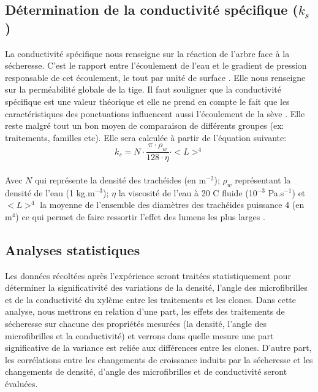 \documentclass{report}
\begin{document}
\subsection*{Détermination de la conductivité spécifique ($k_{s}$)}
La conductivité spécifique nous renseigne sur la réaction de l'arbre face à la sécheresse. C'est le rapport entre l’écoulement de l’eau et le gradient de pression responsable de cet écoulement, le tout par unité de surface \citep{Tyree1991}. Elle nous renseigne sur la perméabilité globale de la tige. Il faut souligner que la conductivité spécifique est une valeur théorique et elle ne prend en compte le fait que les caractéristiques des ponctuations influencent aussi l'écoulement de la sève \citep{Pothier1989}. %
Elle reste malgré tout un bon moyen de comparaison de différents groupes (ex: traitements, familles etc).  Elle sera calculée à partir de l'équation suivante: \\

\begin{equation}\label{eq:2}
k_{s} = N\cdot \frac{\pi \cdot \rho_{w}}{128 \cdot \eta} \cdot <L>^{4}
\end{equation}\\

Avec $N$ qui représente la densité des trachéides (en m$^{-2}$); $\rho_{w}$ représentant la densité de l'eau (1 kg.m$^{-3}$); $\eta$ la viscosité de l'eau à 20  \textdegree C fluide (10$^{-3}$ Pa.s$^{-1}$) et $<L>^{4}$ la moyenne de l'ensemble des diamètres des trachéides puissance 4 (en m$^{4}$) ce qui permet de faire ressortir l'effet des lumens les plus larges \citep{Tyree1991}.


\subsection*{Analyses statistiques}
Les données récoltées après l'expérience seront traitées statistiquement pour déterminer la significativité des variations de la densité, l'angle des microfibrilles et de la conductivité du xylème entre les traitements et les clones. Dans cette analyse, nous mettrons en relation d'une part, les effets des traitements de sécheresse sur chacune des propriétés mesurées (la densité, l'angle des microfibrilles et la conductivité) et verrons dans quelle mesure une part significative de la variance est reliée aux différences entre les clones. D'autre part, les corrélations entre les changements de croissance induits par la sécheresse et les changements de densité, d'angle des microfibrilles et de conductivité seront évaluées. \\ 
\end{document}
